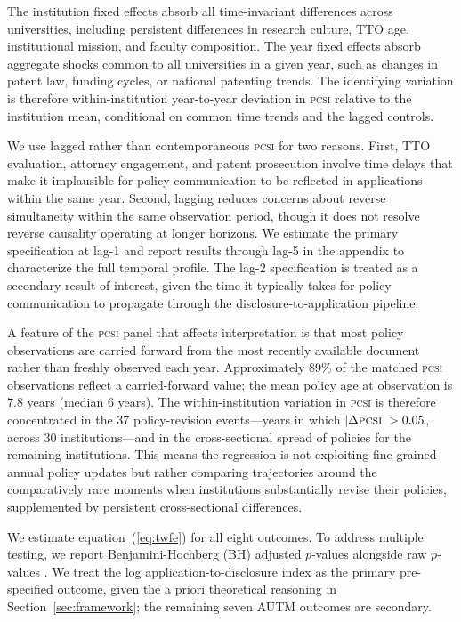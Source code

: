 \documentclass[12pt]{article}
\newcommand{\PCSI}{\textsc{pcsi}}
\begin{document}
The institution fixed effects absorb all time-invariant differences across universities,
including persistent differences in research culture, TTO age, institutional mission, and
faculty composition. The year fixed effects absorb aggregate shocks common to all
universities in a given year, such as changes in patent law, funding cycles, or national
patenting trends. The identifying variation is therefore within-institution
year-to-year deviation in \PCSI{} relative to the institution mean, conditional on
common time trends and the lagged controls.

We use lagged rather than contemporaneous \PCSI{} for two reasons. First, TTO evaluation,
attorney engagement, and patent prosecution involve time delays that make it implausible
for policy communication to be reflected in applications within the same year. Second,
lagging reduces concerns about reverse simultaneity within the same observation period,
though it does not resolve reverse causality operating at longer horizons. We estimate
the primary specification at lag-1 and report results through lag-5 in the appendix
to characterize the full temporal profile. The lag-2 specification is treated as a
secondary result of interest, given the time it typically takes for policy communication
to propagate through the disclosure-to-application pipeline.

A feature of the \PCSI{} panel that affects interpretation is that most policy
observations are carried forward from the most recently available document rather than
freshly observed each year. Approximately 89\% of the matched \PCSI{} observations
reflect a carried-forward value; the mean policy age at observation is 7.8 years
(median 6 years). The within-institution variation in \PCSI{} is therefore
concentrated in the 37 policy-revision events---years in which $|\Delta\PCSI{}|>0.05$,
across 30 institutions---and in the cross-sectional spread of policies for the remaining
institutions. This means the regression is not exploiting fine-grained annual policy
updates but rather comparing trajectories around the comparatively rare moments when
institutions substantially revise their policies, supplemented by persistent
cross-sectional differences.

We estimate equation~(\ref{eq:twfe}) for all eight outcomes. To address multiple
testing, we report Benjamini-Hochberg (BH) adjusted $p$-values alongside raw $p$-values
\citep{bakerlarkerwang2022}. We treat the log application-to-disclosure index as the
primary pre-specified outcome, given the a priori theoretical reasoning in
Section~\ref{sec:framework}; the remaining seven AUTM outcomes are secondary.
\end{document}
